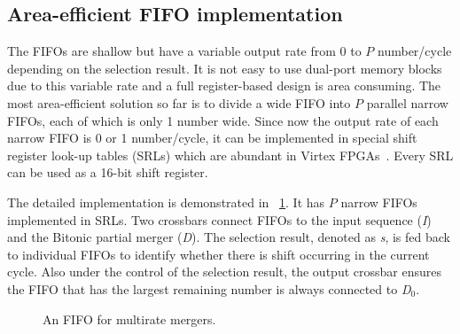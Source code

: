 \documentclass[10pt, conference]{IEEEtran}
\begin{document}
\subsection{Area-efficient FIFO implementation}\label{sec_fifo_imp}

The FIFOs are shallow but have a variable output rate from 0 to $P$ number/cycle depending on the selection result.
It is not easy to use dual-port memory blocks due to this variable rate and a full register-based design is area consuming.
The most area-efficient solution so far is to divide a wide FIFO into $P$ parallel narrow FIFOs, each of which is only 1 number wide.
Since now the output rate of each narrow FIFO is 0 or 1 number/cycle, it can be implemented in special shift register look-up tables (SRLs) which are abundant in Virtex FPGAs~\cite{virtex7CLB2014}. 
Every SRL can be used as a 16-bit shift register.

The detailed implementation is demonstrated in \figurename~\ref{fig_pmfifo}. It has $P$ narrow FIFOs implemented in SRLs.
Two crossbars connect FIFOs to the input sequence (\emph{I}) and the Bitonic partial merger (\emph{D}).
The selection result, denoted as \emph{s}, is fed back to individual FIFOs to identify whether there is shift occurring in the current cycle.
Also under the control of the selection result, the output crossbar ensures the FIFO that has the largest remaining number is always connected to \emph{D$_0$}.

\begin{figure}[bt]
\caption{An FIFO for multirate mergers.}\label{fig_pmfifo}
\end{figure}
\end{document}
